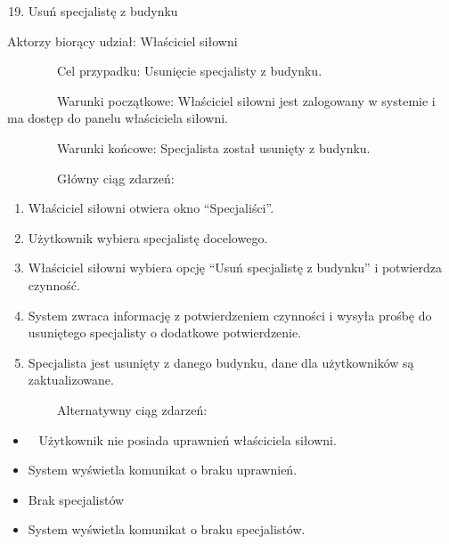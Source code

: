 \begin{enumerate}
\setcounter{enumi}{18}
\tightlist
\item
  {Usuń specjalistę z budynku}
\end{enumerate}

{Aktorzy biorący udział: Właściciel siłowni}

{~~~~~~~~Cel przypadku: Usunięcie specjalisty z budynku.}

{~~~~~~~~Warunki początkowe: Właściciel siłowni jest zalogowany w
systemie i ma dostęp do panelu właściciela siłowni.}

{~~~~~~~~Warunki końcowe: Specjalista został usunięty z budynku.}

{~~~~~~~~Główny ciąg zdarzeń:}

\begin{enumerate}
\tightlist
\item
  {Właściciel siłowni otwiera okno ``Specjaliści''.}
\item
  {Użytkownik wybiera specjalistę docelowego.}
\item
  {Właściciel siłowni wybiera opcję ``Usuń specjalistę z budynku'' i
  potwierdza czynność.}
\item
  {System zwraca informację z potwierdzeniem czynności i wysyła prośbę
  do usuniętego specjalisty o dodatkowe potwierdzenie.}
\item
  {Specjalista jest usunięty z danego budynku, dane dla użytkowników są
  zaktualizowane.}
\end{enumerate}

{~~~~~~~~Alternatywny ciąg zdarzeń:}

\begin{itemize}
\tightlist
\item
  {~ Użytkownik nie posiada uprawnień właściciela siłowni.}
\end{itemize}

\begin{itemize}
\tightlist
\item
  {System wyświetla komunikat o braku uprawnień.}
\end{itemize}

\begin{itemize}
\tightlist
\item
  {Brak specjalistów}
\end{itemize}

\begin{itemize}
\tightlist
\item
  {System wyświetla komunikat o braku specjalistów.}
\end{itemize}

